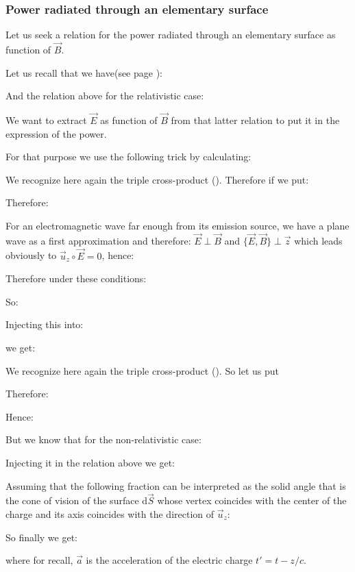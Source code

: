 	\subsubsection{Power radiated through an elementary surface}
	Let us seek a relation for the power radiated through an elementary surface as function of $\vec{B}$.
	
	Let us recall that we have(see page \pageref{poynting vector}):
	
	And the relation above for the relativistic case: 
	
	We want to extract $\vec{E}$ as function of $\vec{B}$ from that latter relation to put it in the expression of the power.
	
	For that purpose we use the following trick by calculating:
	
	We recognize here again the triple cross-product (). Therefore if we put:
	
	Therefore:
	
	For an electromagnetic wave far enough from its emission source, we have a plane wave as a first approximation and therefore: $\vec{E}\perp\vec{B}$ and $\{\vec{E},\vec{B}\}\perp\vec{z}$ which leads obviously to $\vec{u}_z\circ\vec{E}=0$, hence:
	
	Therefore under these conditions:
	
	So:
	
	Injecting this into:
	
	we get:
	
	We recognize here again the triple cross-product (). So let us put
	
	Therefore:
	
	Hence:
	
	But we know that for the non-relativistic case:
	
	Injecting it in the relation above we get:
	
	Assuming that the following fraction can be interpreted as the solid angle that is the cone of vision of the surface $\mathrm{d}\vec{S}$ whose vertex coincides with the center of the charge and its axis coincides with the direction of $\vec{u}_z$:
	
	So finally we get:
	
	where for recall, $\vec{a}$ is the acceleration of the electric charge $t'=t-z/c$.
	
